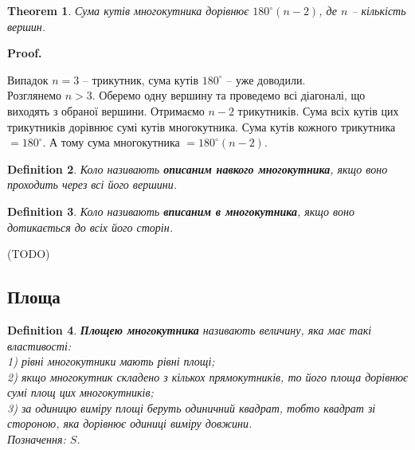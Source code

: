 \documentclass[a4paper, 10pt]{article}
\makeatletter
\theoremstyle{theoremdd}
\newtheorem{theorem}{Theorem}[subsection]
\theoremstyle{theoremdd}
\theoremstyle{theoremdd}
\newtheorem{definition}[theorem]{Definition}
\theoremstyle{theoremdd}
\theoremstyle{theoremdd}
\theoremstyle{theoremdd}
\theoremstyle{theoremdd}
\theoremstyle{theoremdd}
\theoremstyle{theoremdd}
\renewenvironment{proof}[1][Proof.\\]{\par
\pushQED{\hfill \qed}%
\normalfont \topsep6\p@\@plus6\p@\relax
\trivlist
\item\relax
{\bfseries
#1\@addpunct{.}}\hspace\labelsep\ignorespaces
}{%
\popQED\endtrivlist\@endpefalse
}
\makeatother
\begin{document}
\begin{theorem}
Сума кутів многокутника дорівнює $180^\circ (n-2)$, де $n$ -- кількість вершин.
\end{theorem}

\begin{proof}
Випадок $n=3$ -- трикутник, сума кутів $180^\circ$ -- уже доводили.\\
Розглянемо $n > 3$. Оберемо одну вершину та проведемо всі діагоналі, що виходять з обраної вершини. Отримаємо $n-2$ трикутників. Сума всіх кутів цих трикутників дорівнює сумі кутів многокутника. Сума кутів кожного трикутника $= 180^\circ$. А тому сума многокутника $= 180^\circ (n-2)$.
\begin{figure}[H]
\centering
{}
\end{figure}
\end{proof}

\begin{definition}
Коло називають \textbf{описаним навкого многокутника}, якщо воно проходить через всі його вершини.
\end{definition}

\begin{definition}
Коло називають \textbf{вписаним в многокутника}, якщо воно дотикається до всіх його сторін.
\end{definition}
(TODO)

\subsection{Площа}
\begin{definition}
\textbf{Площею многокутника} називають величину, яка має такі властивості:\\
1) рівні многокутники мають рівні площі;\\
2) якщо многокутник складено з кількох прямокутників, то його площа дорівнює сумі площ цих многокутників;\\
3) за одиницю виміру площі беруть одиничний квадрат, тобто квадрат зі стороною, яка дорівнює одиниці виміру довжини.\\
Позначення: $S$.
\end{definition}
\end{document}
